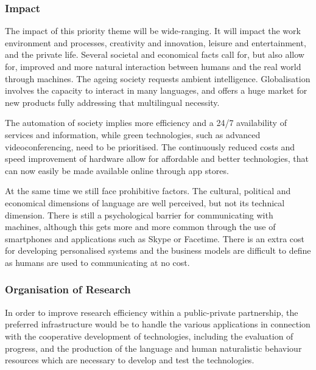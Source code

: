 \documentclass[10pt, plain]{../../metanetpaper}
\begin{document}
\begin{multicols}{2}
\subsubsection{Impact}
\label{sec:impact-pt3}

The impact of this priority theme will be wide-ranging. It will impact the work environment and processes, creativity and innovation, leisure and entertainment, and the private life. Several societal and economical facts call for, but also allow for, improved and more natural interaction between humans and the real world through machines. The ageing society requests ambient intelligence. Globalisation involves the capacity to interact in many languages, and offers a huge market for new products fully addressing that multilingual necessity.
 
The automation of society implies more efficiency and a 24/7 availability of services and information, while green technologies, such as advanced videoconferencing, need to be prioritised. The continuously reduced costs and speed improvement of hardware allow for affordable and better technologies, that can now easily be made available online through app stores.
 
At the same time we still face prohibitive factors. The cultural, political and economical dimensions of language are well perceived, but not its technical dimension. There is still a psychological barrier for communicating with machines, although this gets more and more common through the use of smartphones and applications such as Skype or Facetime. There is an extra cost for developing personalised systems and the business models are difficult to define as humans are used to communicating at no cost.


\subsubsection{Organisation of Research}
\label{sec:organ-rese-pt3}

In order to improve research efficiency within a public-private partnership, the preferred infrastructure would be to handle the various applications in connection with the cooperative development of technologies, including the evaluation of progress, and the production of the language and human naturalistic behaviour resources which are necessary to develop and test the technologies.
 

\end{multicols}
\end{document}
